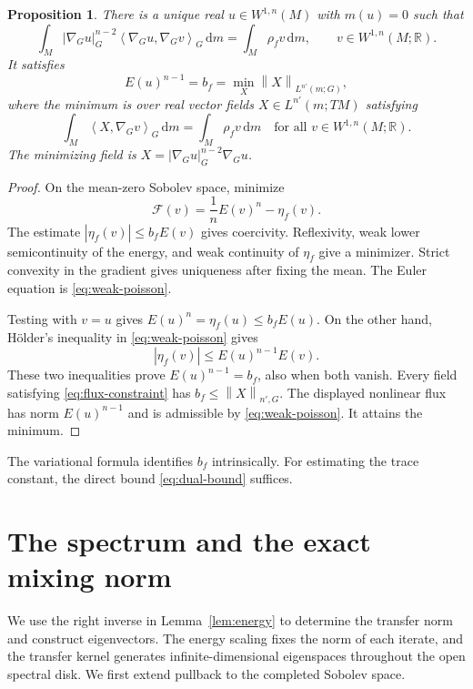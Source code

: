 \documentclass[10pt,a4paper]{amsart}
\newtheorem{proposition}[theorem]{Proposition}
\newcommand{\R}{\mathbb R}
\newcommand{\norm}[1]{\left\lVert #1\right\rVert}
\newcommand{\ip}[2]{\left\langle #1,#2\right\rangle}
\newcommand{\dd}{\mathrm d}
\numberwithin{equation}{section}
\begin{document}
\begin{proposition}\label{prop:variational}
There is a unique real $u\in W^{1,n}(M)$ with $m(u)=0$ such that
\begin{equation}\label{eq:weak-poisson}
 \int_M|\nabla_Gu|_G^{n-2}
       \ip{\nabla_Gu}{\nabla_Gv}_G\,\dd m
 =\int_M\rho_fv\,\dd m,
 \qquad v\in W^{1,n}(M;\R).
\end{equation}
It satisfies
\begin{equation}\label{eq:dual-exact}
 E(u)^{n-1}=b_f
 =\min_X\norm{X}_{L^{n'}(m;G)},
\end{equation}
where the minimum is over real vector fields $X\in L^{n'}(m;TM)$ satisfying
\begin{equation}\label{eq:flux-constraint}
 \int_M\ip{X}{\nabla_Gv}_G\,\dd m=\int_M\rho_fv\,\dd m
 \quad\text{for all }v\in W^{1,n}(M;\R).
\end{equation}
The minimizing field is $X=|\nabla_Gu|_G^{n-2}\nabla_Gu$.
\end{proposition}

\begin{proof}
On the mean-zero Sobolev space, minimize
\[
 \mathcal F(v)=\frac1n E(v)^n-\eta_f(v).
\]
The estimate $|\eta_f(v)|\le b_fE(v)$ gives coercivity. Reflexivity, weak lower semicontinuity of the energy, and weak continuity of $\eta_f$ give a minimizer. Strict convexity in the gradient gives uniqueness after fixing the mean. The Euler equation is \eqref{eq:weak-poisson}.

Testing with $v=u$ gives $E(u)^n=\eta_f(u)\le b_fE(u)$. On the other hand, H\"older's inequality in \eqref{eq:weak-poisson} gives
\[
 |\eta_f(v)|\le E(u)^{n-1}E(v).
\]
These two inequalities prove $E(u)^{n-1}=b_f$, also when both vanish. Every field satisfying \eqref{eq:flux-constraint} has $b_f\le\norm{X}_{n',G}$. The displayed nonlinear flux has norm $E(u)^{n-1}$ and is admissible by \eqref{eq:weak-poisson}. It attains the minimum.
\end{proof}

The variational formula identifies $b_f$ intrinsically. For estimating the trace constant, the direct bound \eqref{eq:dual-bound} suffices.

\section{The spectrum and the exact mixing norm}\label{sec:spectrum}

We use the right inverse in Lemma~\ref{lem:energy} to determine the transfer norm and construct eigenvectors. The energy scaling fixes the norm of each iterate, and the transfer kernel generates infinite-dimensional eigenspaces throughout the open spectral disk. We first extend pullback to the completed Sobolev space.
\end{document}
